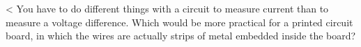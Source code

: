 <%
You have to do different things with a circuit to
measure current than to measure a voltage difference. Which
would be more practical for a printed circuit board, in
which the wires are actually strips of metal embedded inside the board?
